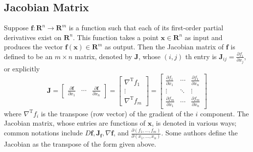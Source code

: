 \documentclass[14pt]{article}
\theoremstyle{definition}
\theoremstyle{remark}
\begin{document}
\subsection{Jacobian Matrix}
Suppose $\mathbf{f}: \mathbf{R}^n \rightarrow \mathbf{R}^m$ is a function such that each of its first-order partial derivatives exist on $\mathbf{R}^n$. This function takes a point $\mathbf{x} \in \mathbf{R}^n$ as input and produces the vector $\mathbf{f}(\mathbf{x}) \in \mathbf{R}^m$ as output. Then the Jacobian matrix of $\mathbf{f}$ is defined to be an $m \times n$ matrix, denoted by $\mathbf{J}$, whose $(i, j)$ th entry is $\mathbf{J}_{i j}=\frac{\partial f_i}{\partial x_j}$, or explicitly
$$
    \mathbf{J}=\left[\begin{array}{ccc}
            \frac{\partial \mathbf{f}}{\partial x_1} & \cdots & \frac{\partial \mathbf{f}}{\partial x_n}
        \end{array}\right]=\left[\begin{array}{c}
            \nabla^{\mathrm{T}} f_1 \\
            \vdots                  \\
            \nabla^{\mathrm{T}} f_m
        \end{array}\right]=\left[\begin{array}{ccc}
            \frac{\partial f_1}{\partial x_1} & \cdots & \frac{\partial f_1}{\partial x_n} \\
            \vdots                            & \ddots & \vdots                            \\
            \frac{\partial f_m}{\partial x_1} & \cdots & \frac{\partial f_m}{\partial x_n}
        \end{array}\right]
$$
where $\nabla^{\mathrm{T}} f_i$ is the transpose (row vector) of the gradient of the $i$ component.
The Jacobian matrix, whose entries are functions of $\mathbf{x}$, is denoted in various ways; common notations include $ D \mathbf{f}, \mathbf{J}_{\mathbf{f}}, \nabla \mathbf{f}$, and $\frac{\partial\left(f_1, \ldots, f_m\right)}{\partial\left(x_1, \ldots, x_n\right)}$. Some authors define the Jacobian as the transpose of the form given above.
\end{document}
